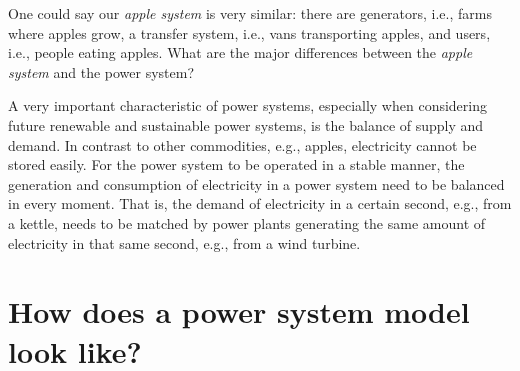 \begin{kaobox}[frametitle=Task]
One could say our \textit{apple system} is very similar: there are generators, i.e., farms where apples grow, a transfer system, i.e., vans transporting apples, and users, i.e., people eating apples. What are the major differences between the \textit{apple system} and the power system?
\end{kaobox}

A very important characteristic of power systems, especially when considering future renewable and sustainable power systems, is the balance of supply and demand. In contrast to other commodities, e.g., apples, electricity cannot be stored easily. For the power system to be operated in a stable manner, the generation and consumption of electricity in a power system need to be balanced in every moment. That is, the demand of electricity in a certain second, e.g., from a kettle, needs to be matched by power plants generating the same amount of electricity in that same second, e.g., from a wind turbine.


\section{How does a power system model look like?}



